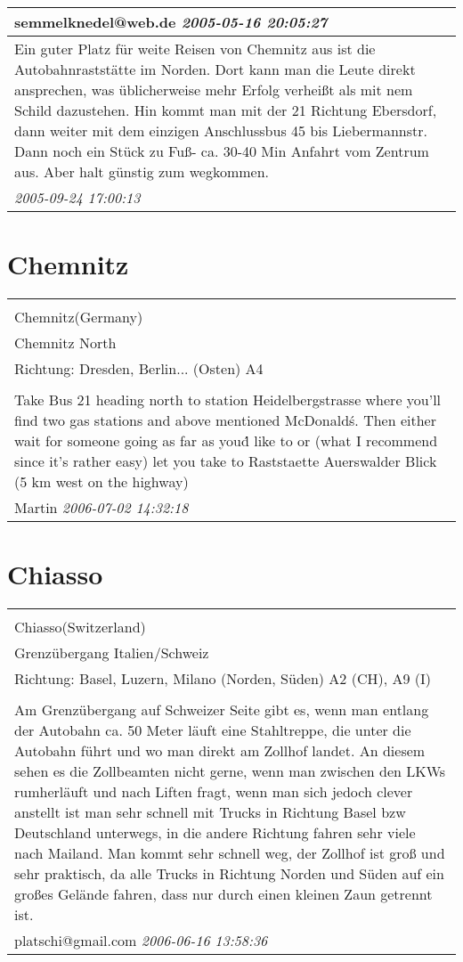 \documentclass[a4paper,12pt]{article}
\begin{document}
\begin{tabular}{|p{13cm}|}
semmelknedel@web.de \textit{ 2005-05-16 20:05:27 }\\\hline Ein guter Platz für weite Reisen von Chemnitz aus ist die Autobahnraststätte im Norden. Dort kann man die Leute direkt ansprechen, was üblicherweise mehr Erfolg verheißt als mit nem Schild dazustehen.
Hin kommt man mit der 21 Richtung Ebersdorf, dann weiter mit dem einzigen Anschlussbus 45 bis Liebermannstr. Dann noch ein Stück zu Fuß- ca. 30-40 Min Anfahrt vom Zentrum aus. Aber halt günstig zum wegkommen. \\
\textit{ 2005-09-24 17:00:13 }\\\hline
\end{tabular}


\section{Chemnitz}
\begin{tabular}{|p{13cm}|}
\hline\\
Chemnitz(Germany)\\
Chemnitz North\\
Richtung: Dresden, Berlin... (Osten) A4 \\
\hline\\
Take Bus 21 heading north to station Heidelbergstrasse where you'll find two gas stations and above mentioned McDonald\'s.
Then either wait for someone going as far as you\'d like to or (what I recommend since it's rather easy) let you take to Raststaette Auerswalder Blick (5 km west on the highway) \\
Martin \textit{ 2006-07-02 14:32:18 }\\\hline
\end{tabular}


\section{Chiasso}
\begin{tabular}{|p{13cm}|}
\hline\\
Chiasso(Switzerland)\\
Grenzübergang Italien/Schweiz\\
Richtung: Basel, Luzern, Milano (Norden, Süden) A2 (CH), A9 (I) \\
\hline\\
Am Grenzübergang auf Schweizer Seite gibt es, wenn man entlang der Autobahn ca. 50 Meter läuft eine Stahltreppe, die unter die Autobahn führt und wo man direkt am Zollhof landet. An diesem sehen es die Zollbeamten nicht gerne, wenn man zwischen den LKWs rumherläuft und nach Liften fragt, wenn man sich jedoch clever anstellt ist man sehr schnell mit Trucks in Richtung Basel bzw Deutschland unterwegs, in die andere Richtung fahren sehr viele nach Mailand. Man kommt sehr schnell weg, der Zollhof ist groß und sehr praktisch, da alle Trucks in Richtung Norden und Süden auf ein großes Gelände fahren, dass nur durch einen kleinen Zaun getrennt ist. \\
platschi@gmail.com \textit{ 2006-06-16 13:58:36 }\\\hline
\end{tabular}
\end{document}

